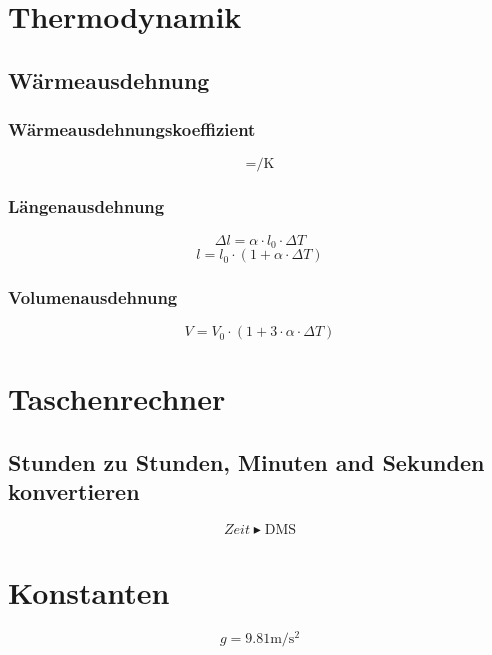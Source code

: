 \documentclass[a4paper]{IEEEtran}
\begin{document}
  \section{Thermodynamik}
  \subsection{Wärmeausdehnung}
  \subsubsection{Wärmeausdehnungskoeffizient}
  \begin{equation}
    [\alpha] = \si{\per\kelvin}
  \end{equation}
  \subsubsection{Längenausdehnung}
  \begin{equation}
    \Delta l = \alpha \cdot l_0 \cdot \Delta T
  \end{equation}
  \begin{equation}
    l = l_0 \cdot (1 + \alpha \cdot \Delta T)
  \end{equation}
  \subsubsection{Volumenausdehnung}
  \begin{equation}
    V = V_0 \cdot (1 + 3 \cdot \alpha \cdot \Delta T)
  \end{equation}

  \section{Taschenrechner}
  \subsection{Stunden zu Stunden, Minuten and Sekunden konvertieren}
  \begin{equation}
    Zeit \blacktriangleright \mbox{DMS}
  \end{equation}

  \section{Konstanten}
  \begin{equation}
    g = 9.81 \si{\metre\per\square\second}
  \end{equation}
\end{document}
